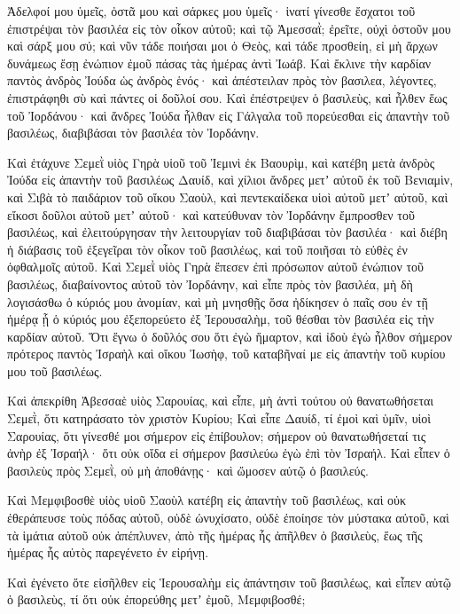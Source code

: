 {Ἀδελφοί μου ὑμεῖς, ὀστᾶ μου καὶ σάρκες μου ὑμεῖς· ἱνατί γίνεσθε ἔσχατοι τοῦ ἐπιστρέψαι τὸν βασιλέα εἰς τὸν οἶκον αὐτοῦ;
καὶ τῷ Ἀμεσσαῒ; ἐρεῖτε, οὐχὶ ὀστοῦν μου καὶ σάρξ μου σύ; καὶ νῦν τάδε ποιήσαι μοι ὁ Θεὸς, καὶ τάδε προσθείη, εἰ μὴ ἄρχων δυνάμεως ἔσῃ ἐνώπιον ἐμοῦ πάσας τὰς ἡμέρας ἀντὶ Ἰωάβ.
Καὶ ἔκλινε τὴν καρδίαν παντὸς ἀνδρὸς Ἰούδα ὡς ἀνδρὸς ἑνός· καὶ ἀπέστειλαν πρὸς τὸν βασιλεα, λέγοντες, ἐπιστράφηθι σὺ καὶ πάντες οἱ δοῦλοί σου.
Καὶ ἐπέστρεψεν ὁ βασιλεὺς, καὶ ἦλθεν ἕως τοῦ Ἰορδάνου· καὶ ἄνδρες Ἰούδα ἦλθαν εἰς Γάλγαλα τοῦ πορεύεσθαι εἰς ἀπαντὴν τοῦ βασιλέως, διαβιβάσαι τὸν βασιλέα τὸν Ἰορδάνην.
\par }{\PP {}Καὶ ἐτάχυνε Σεμεῒ υἱὸς Γηρὰ υἱοῦ τοῦ Ἰεμινὶ ἐκ Βαουρὶμ, καὶ κατέβη μετὰ ἀνδρὸς Ἰούδα εἰς ἀπαντὴν τοῦ βασιλέως Δαυίδ,
καὶ χίλιοι ἄνδρες μετʼ αὐτοῦ ἐκ τοῦ Βενιαμὶν, καὶ Σιβὰ τὸ παιδάριον τοῦ οἴκου Σαοὺλ, καὶ πεντεκαίδεκα υἱοὶ αὐτοῦ μετʼ αὐτοῦ, καὶ εἴκοσι δοῦλοι αὐτοῦ μετʼ αὐτοῦ· καὶ κατεύθυναν τὸν Ἰορδάνην ἔμπροσθεν τοῦ βασιλέως,
καὶ ἐλειτούργησαν τὴν λειτουργίαν τοῦ διαβιβάσαι τὸν βασιλέα· καὶ διέβη ἡ διάβασις τοῦ ἐξεγεῖραι τὸν οἶκον τοῦ βασιλέως, καὶ τοῦ ποιῆσαι τὸ εὐθὲς ἐν ὀφθαλμοῖς αὐτοῦ. Καὶ Σεμεῒ υἱὸς Γηρὰ ἔπεσεν ἐπὶ πρόσωπον αὐτοῦ ἐνώπιον τοῦ βασιλέως, διαβαίνοντος αὐτοῦ τὸν Ἰορδάνην,
καὶ εἶπε πρὸς τὸν βασιλέα, μὴ δὴ λογισάσθω ὁ κύριός μου ἀνομίαν, καὶ μὴ μνησθῇς ὅσα ἠδίκησεν ὁ παῖς σου ἐν τῇ ἡμέρᾳ ᾗ ὁ κύριός μου ἐξεπορεύετο ἐξ Ἰερουσαλὴμ, τοῦ θέσθαι τὸν βασιλέα εἰς τὴν καρδίαν αὐτοῦ.
Ὅτι ἔγνω ὁ δοῦλός σου ὅτι ἐγὼ ἥμαρτον, καὶ ἰδοὺ ἐγὼ ἦλθον σήμερον πρότερος παντὸς Ἰσραὴλ καὶ οἴκου Ἰωσὴφ, τοῦ καταβῆναί με εἰς ἀπαντὴν τοῦ κυρίου μου τοῦ βασιλέως.
\par }{\PP {}Καὶ ἀπεκρίθη Ἀβεσσαὲ υἱὸς Σαρουίας, καὶ εἶπε, μὴ ἀντὶ τούτου οὐ θανατωθήσεται Σεμεῒ, ὅτι κατηράσατο τὸν χριστὸν Κυρίου;
Καὶ εἶπε Δαυίδ, τί ἐμοὶ καὶ ὑμῖν, υἱοὶ Σαρουίας, ὅτι γίνεσθέ μοι σήμερον εἰς ἐπίβουλον; σήμερον οὐ θανατωθήσεταί τις ἀνὴρ ἐξ Ἰσραήλ· ὅτι οὐκ οἴδα εἰ σήμερον βασιλεύω ἐγὼ ἐπὶ τὸν Ἰσραήλ.
Καὶ εἶπεν ὁ βασιλεὺς πρὸς Σεμεῒ, οὐ μὴ ἀποθάνῃς· καὶ ὤμοσεν αὐτῷ ὁ βασιλεύς.
\par }{\PP {}Καὶ Μεμφιβοσθὲ υἱὸς υἱοῦ Σαοὺλ κατέβη εἰς ἀπαντὴν τοῦ βασιλέως, καὶ οὐκ ἐθεράπευσε τοὺς πόδας αὐτοῦ, οὐδὲ ὠνυχίσατο, οὐδὲ ἐποίησε τὸν μύστακα αὐτοῦ, καὶ τὰ ἱμάτια αὐτοῦ οὐκ ἀπέπλυνεν, ἀπὸ τῆς ἡμέρας ἧς ἀπῆλθεν ὁ βασιλεὺς, ἕως τῆς ἡμέρας ἧς αὐτὸς παρεγένετο ἐν εἰρήνῃ.
\par }{\PP {}Καὶ ἐγένετο ὅτε εἰσῆλθεν εἰς Ἱερουσαλὴμ εἰς ἀπάντησιν τοῦ βασιλέως, καὶ εἶπεν αὐτῷ ὁ βασιλεὺς, τί ὅτι οὐκ ἐπορεύθης μετʼ ἐμοῦ, Μεμφιβοσθέ;
}
